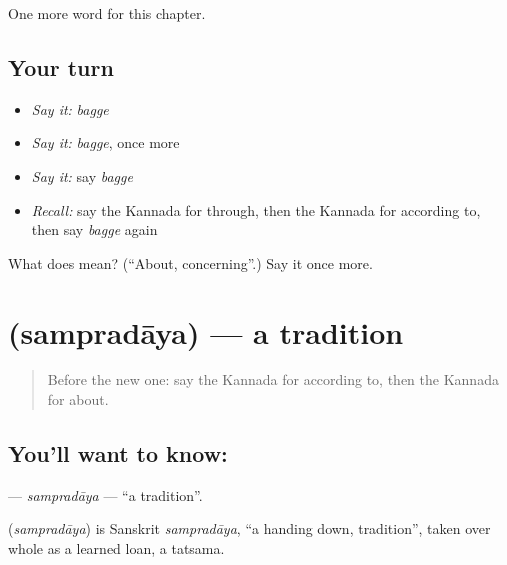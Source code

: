\begin{grammarlens}[title={What you've built}]
One more word for this chapter.
\end{grammarlens}

\subsection*{Your turn}
\begin{itemize}
\raggedright
  \item \emph{Say it:} \emph{bagge}
  \item \emph{Say it:} \emph{bagge}, once more
  \item \emph{Say it:} say \emph{bagge}
  \item \emph{Recall:} say the Kannada for through, then the Kannada for according to, then say \emph{bagge} again
\end{itemize}

\begin{tcolorbox}[breakable,colback=teal!4,colframe=teal!35!black,title={Before you move on}]
What does  mean? (\textquotedblleft{}About, concerning\textquotedblright{}.) Say it once more.
\end{tcolorbox}
\section[\texorpdfstring{\kn{ಸಂಪ್ರದಾಯ} (sampradāya)}{ಸಂಪ್ರದಾಯ (sampradāya)}]{ (sampradāya) — a tradition}

\label{lesson:KA-C215-sampradaya}



\begin{quote}
Before the new one: say the Kannada for according to, then the Kannada for about.
\end{quote}

\subsection*{You'll want to know: }
\textbf{} — \emph{sampradāya} — \textquotedblleft{}a tradition\textquotedblright{}.

\begin{cousinweb}
\textbf{} (\emph{sampradāya}) is Sanskrit \emph{sampradāya}, \textquotedblleft{}a handing down, tradition\textquotedblright{}, taken over whole as a learned loan, a tatsama.
\end{cousinweb}

